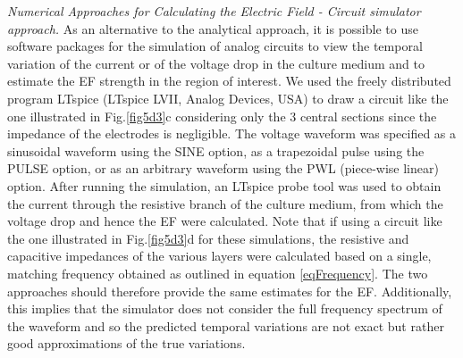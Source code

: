 \noindent \textit{Numerical Approaches for Calculating the Electric Field - Circuit simulator approach.} As an alternative to the analytical approach, it is possible to use software packages for the simulation of analog circuits to view the temporal variation of the current or of the voltage drop in the culture medium and to estimate the \acs{EF} strength in the region of interest. We used the freely distributed program LTspice (LTspice LVII, Analog Devices, USA) to draw a circuit like the one illustrated in Fig.\ref{fig5d3}c considering only the 3 central sections since the impedance of the electrodes is negligible. The voltage waveform was specified as a sinusoidal waveform using the SINE option, as a trapezoidal pulse using the PULSE option, or as an arbitrary waveform using the PWL (piece-wise linear) option. After running the simulation, an LTspice probe tool was used to obtain the current through the resistive branch of the culture medium, from which the voltage drop and hence the \acs{EF} were calculated. Note that if using a circuit like the one illustrated in Fig.\ref{fig5d3}d for these simulations, the resistive and capacitive impedances of the various layers were calculated based on a single, matching frequency obtained as outlined in equation \ref{eqFrequency}. The two approaches should therefore provide the same estimates for the \acs{EF}. Additionally, this implies that the simulator does not consider the full frequency spectrum of the waveform and so the predicted temporal variations are not exact but rather good approximations of the true variations. \hfill \break

